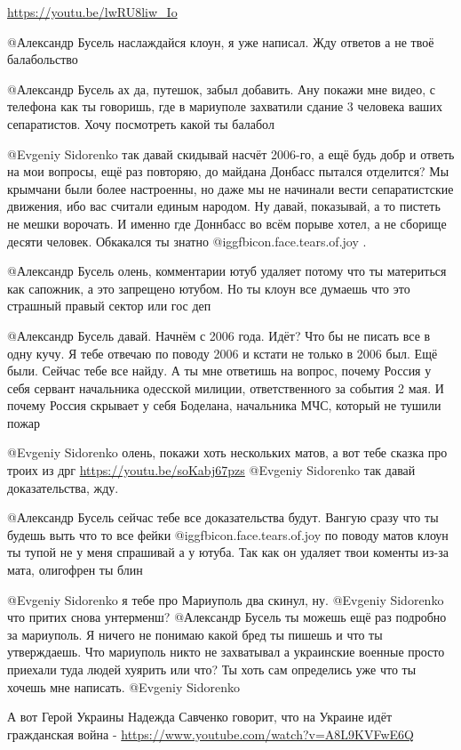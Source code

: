 \begin{multicols}{2}
\begin{itemize}
\url{https://youtu.be/lwRU8liw_Io} 


 @Александр Бусель  наслаждайся клоун, я уже написал. Жду ответов а не твоё балабольство

@Александр Бусель  ах да, путешок, забыл добавить. Ану покажи мне видео, с
телефона как ты говоришь, где в мариуполе захватили сдание 3 человека ваших
сепаратистов. Хочу посмотреть какой ты балабол


@Evgeniy Sidorenko  так давай скидывай насчёт 2006-го, а ещё будь добр и
ответь на мои вопросы, ещё раз повторяю, до майдана Донбасс пытался отделится?
Мы крымчани были более настроенны, но даже мы не начинали вести сепаратистские
движения, ибо вас считали единым народом. Ну давай, показывай, а то пистеть не
мешки ворочать. И именно где Доннбасс во всём порыве хотел, а не сборище
десяти человек. Обкакался ты знатно  @igg{fbicon.face.tears.of.joy} .


@Александр Бусель  олень, комментарии ютуб удаляет потому что ты материться как
сапожник, а это запрещено ютубом. Но ты клоун все думаешь что это страшный
правый сектор или гос деп 


@Александр Бусель  давай. Начнём с 2006 года. Идёт? Что бы не писать все в
одну кучу. Я тебе отвечаю по поводу 2006 и кстати не только в 2006 был. Ещё
были. Сейчас тебе все найду. А ты мне ответишь на вопрос, почему Россия у себя
сервант начальника одесской милиции, ответственного за события 2 мая. И почему
Россия скрывает у себя Боделана, начальника МЧС, который не тушили пожар 

 @Evgeniy Sidorenko  олень, покажи хоть нескольких матов, а вот тебе сказка про
 троих из дрг \url{https://youtu.be/soKabj67pzs}
 @Evgeniy Sidorenko  так давай доказательства, жду.

@Александр Бусель  сейчас тебе все доказательства будут. Вангую сразу что ты
будешь выть что то все фейки @igg{fbicon.face.tears.of.joy}  по поводу матов клоун ты тупой не у меня
спрашивай а у ютуба. Так как он удаляет твои коменты из-за мата, олигофрен ты
блин 

 @Evgeniy Sidorenko  я тебе про Мариуполь два скинул, ну.
 @Evgeniy Sidorenko  что притих снова унтерменш?
 @Александр Бусель  ты можешь ещё раз подробно за мариуполь. Я ничего не понимаю какой бред ты пишешь и что ты утверждаешь. Что мариуполь никто не захватывал а украинские военные просто приехали туда людей хуярить или что? Ты хоть сам определись уже что ты хочешь мне написать.
 @Evgeniy Sidorenko  

А вот Герой Украины Надежда Савченко говорит, что на Украине идёт гражданская
война - \url{https://www.youtube.com/watch?v=A8L9KVFwE6Q} 


\end{itemize} %

\end{multicols} %
